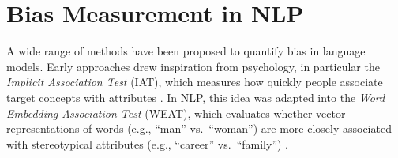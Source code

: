 





\section{Bias Measurement in NLP}

A wide range of methods have been proposed to quantify bias in language models. Early approaches drew inspiration from psychology, in particular the \emph{Implicit Association Test} (IAT), which measures how quickly people associate target concepts with attributes \parencite{greenwald1998iat}. In NLP, this idea was adapted into the \emph{Word Embedding Association Test} (WEAT), which evaluates whether vector representations of words (e.g., ``man'' vs.\ ``woman'') are more closely associated with stereotypical attributes (e.g., ``career'' vs.\ ``family'') \parencite{kurita2019bias}.  

